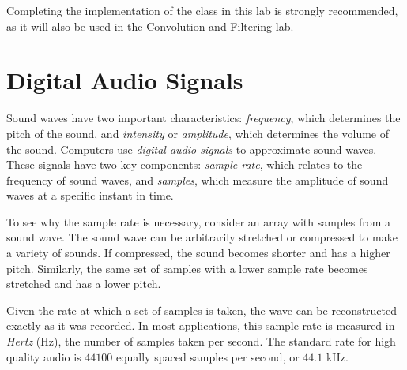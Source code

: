 
\begin{warn}
    Completing the implementation of the  class in this lab is strongly recommended, as it will also be used in the Convolution and Filtering lab.
\end{warn}

\section*{Digital Audio Signals} %

Sound waves have two important characteristics: \emph{frequency}, which determines the pitch of the sound, and \emph{intensity} or \emph{amplitude}, which determines the volume of the sound.
Computers use \emph{digital audio signals} to approximate sound waves.
These signals have two key components: \emph{sample rate}, which relates to the frequency of sound waves, and \emph{samples}, which measure the amplitude of sound waves at a specific instant in time.

To see why the sample rate is necessary, consider an array with samples from a sound wave.
The sound wave can be arbitrarily stretched or compressed to make a variety of sounds.
If compressed, the sound becomes shorter and has a higher pitch.
Similarly, the same set of samples with a lower sample rate becomes stretched and has a lower pitch.

Given the rate at which a set of samples is taken, the wave can be reconstructed exactly as it was recorded.
In most applications, this sample rate is measured in \emph{Hertz} (Hz), the number of samples taken per second.
The standard rate for high quality audio is $44100$ equally spaced samples per second, or $44.1$ kHz.

